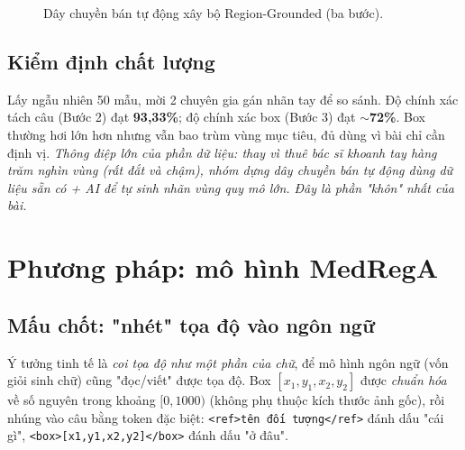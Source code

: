 \documentclass[12pt,a4paper,oneside]{extarticle}
\newcommand{\fact}[1]{#1}
\newcommand{\remark}[1]{\textit{#1}}
\newcommand{\reftok}[1]{\texttt{<ref>#1</ref>}}
\newcommand{\boxtok}[1]{\texttt{<box>#1</box>}}
\begin{document}
\begin{figure}[H]
\centering
{}
\caption{Dây chuyền bán tự động xây bộ Region-Grounded (ba bước).}
\label{fig:pipeline}
\end{figure}

\subsection{Kiểm định chất lượng}
\fact{Lấy ngẫu nhiên 50 mẫu, mời 2 chuyên gia gán nhãn tay để so sánh. Độ chính xác tách câu
(Bước 2) đạt \textbf{93,33\%}; độ chính xác box (Bước 3) đạt \textbf{$\sim$72\%}. Box thường hơi
lớn hơn nhưng vẫn bao trùm vùng mục tiêu, đủ dùng vì bài chỉ cần định vị.}
\remark{Thông điệp lớn của phần dữ liệu: thay vì thuê bác sĩ khoanh tay hàng trăm nghìn vùng
(rất đắt và chậm), nhóm dựng dây chuyền bán tự động dùng dữ liệu sẵn có + AI để tự sinh nhãn vùng
quy mô lớn. Đây là phần "khôn" nhất của bài.}

\section{Phương pháp: mô hình MedRegA}

\subsection{Mấu chốt: "nhét" tọa độ vào ngôn ngữ}
\fact{Ý tưởng tinh tế là \emph{coi tọa độ như một phần của chữ}, để mô hình ngôn ngữ (vốn giỏi
sinh chữ) cũng "đọc/viết" được tọa độ. Box $[x_1,y_1,x_2,y_2]$ được \emph{chuẩn hóa} về số nguyên
trong khoảng $[0, 1000)$ (không phụ thuộc kích thước ảnh gốc), rồi nhúng vào câu bằng token đặc
biệt: \reftok{tên đối tượng} đánh dấu "cái gì", \boxtok{[x1,y1,x2,y2]} đánh dấu "ở đâu".}
\end{document}
